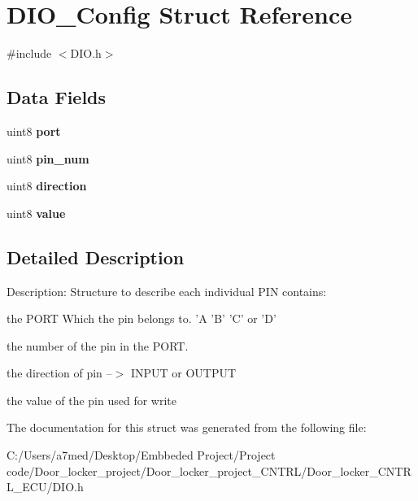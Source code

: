 \hypertarget{struct_d_i_o___config}{\section{D\+I\+O\+\_\+\+Config Struct Reference}
\label{struct_d_i_o___config}
}


{\ttfamily \#include $<$D\+I\+O.\+h$>$}

\subsection*{Data Fields}
\begin{DoxyCompactItemize}
\item 
\hypertarget{struct_d_i_o___config_acb208cab036c35aca1dff3c0c394ba95}{uint8 {\bfseries port}}\label{struct_d_i_o___config_acb208cab036c35aca1dff3c0c394ba95}

\item 
\hypertarget{struct_d_i_o___config_accd397c7c1d1944bd8b713af918a58c7}{uint8 {\bfseries pin\+\_\+num}}\label{struct_d_i_o___config_accd397c7c1d1944bd8b713af918a58c7}

\item 
\hypertarget{struct_d_i_o___config_a99283a3fa628676ec7ca1edcba1fea6a}{uint8 {\bfseries direction}}\label{struct_d_i_o___config_a99283a3fa628676ec7ca1edcba1fea6a}

\item 
\hypertarget{struct_d_i_o___config_ab0691bf8f97b00f4f65387b993efa4d9}{uint8 {\bfseries value}}\label{struct_d_i_o___config_ab0691bf8f97b00f4f65387b993efa4d9}

\end{DoxyCompactItemize}


\subsection{Detailed Description}
Description\+: Structure to describe each individual P\+I\+N contains\+:
\begin{DoxyEnumerate}
\item the P\+O\+R\+T Which the pin belongs to. 'A 'B' 'C' or 'D'
\item the number of the pin in the P\+O\+R\+T.
\item the direction of pin --$>$ I\+N\+P\+U\+T or O\+U\+T\+P\+U\+T
\item the value of the pin used for write 
\end{DoxyEnumerate}

The documentation for this struct was generated from the following file\+:\begin{DoxyCompactItemize}
\item 
C\+:/\+Users/a7med/\+Desktop/\+Embbeded Project/\+Project code/\+Door\+\_\+locker\+\_\+project/\+Door\+\_\+locker\+\_\+project\+\_\+\+C\+N\+T\+R\+L/\+Door\+\_\+locker\+\_\+\+C\+N\+T\+R\+L\+\_\+\+E\+C\+U/D\+I\+O.\+h\end{DoxyCompactItemize}
